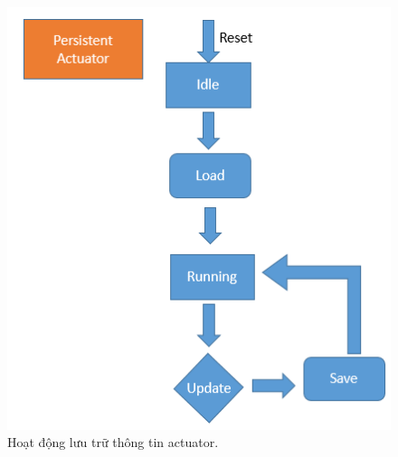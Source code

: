\documentclass[a4paper,12pt,oneside]{article}
\begin{document}
\begin{itemize}
\begin{itemize}
	\end{itemize}
	
\begin{figure}[H]
	\centering
	\includegraphics[scale=.6]{hinh/persistent_actuator.PNG}
	\caption{Hoạt động lưu trữ thông tin actuator.}
\end{figure}


\end{itemize}
\end{document}
